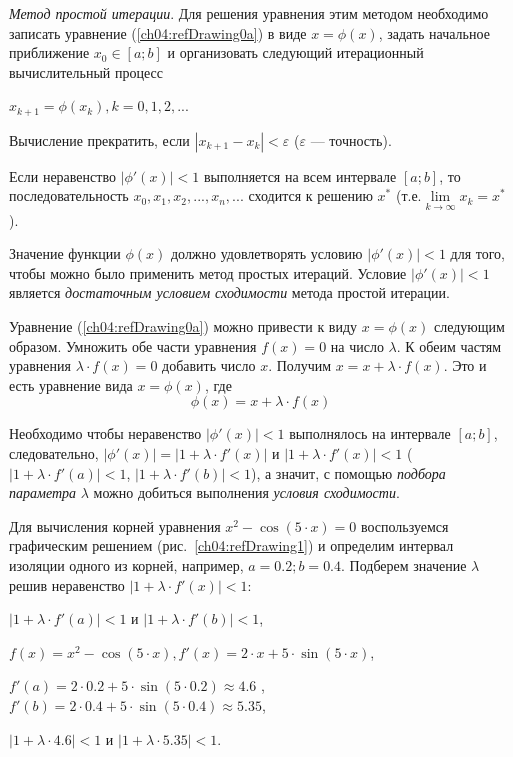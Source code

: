 \emph{Метод простой итерации}. Для решения уравнения этим методом необходимо записать уравнение
(\ref{ch04:refDrawing0a}) в виде  $x=\phi(x)$, задать начальное приближение  $x_0\in [a;b]$ и организовать следующий
итерационный вычислительный процесс 

$x_{k+1}=\phi(x_k),k=0,1,2,...$

Вычисление прекратить, если  $|x_{k+1}-x_k|<\varepsilon$
($\varepsilon$ --- точность).

Если неравенство  $|\phi'(x)|<1$ выполняется на всем интервале  $[a;b]$, то последовательность 
$x_0, x_1, x_2,...,x_n,...$ сходится к решению $x^*$ (т.е.$\lim\limits_{k\rightarrow \infty}x_k=x^*$).


Значение функции  $\phi(x)$  должно удовлетворять условию  $|\phi'(x)|<1$  для того, чтобы можно было применить метод
простых итераций. Условие  $|\phi'(x)|<1$  является
\emph{достаточным условием сходимости} метода простой итерации.

Уравнение (\ref{ch04:refDrawing0a}) можно привести к виду  $x=\phi(x)$ 
следующим образом. Умножить обе части уравнения  $f(x)=0$
на число  $\lambda$. К обеим частям уравнения  $\lambda\cdot f(x)=0$ добавить число $x$. Получим 
$x=x+\lambda\cdot f(x)$. Это и есть уравнение вида  $x=\phi(x)$, где 
\begin{equation}\label{ch04:refDrawing3a}
 \phi(x)=x+\lambda\cdot f(x)
\end{equation}

Необходимо чтобы неравенство  $|\phi'(x)|<1$ выполнялось на интервале  $[a;b]$, следовательно, 
$|\phi'(x)|=|1+\lambda\cdot f'(x)|$  и  $|1+\lambda\cdot f'(x)|<1$  ($|1+\lambda\cdot f'(a)|<1$,  $|1+\lambda\cdot
f'(b)|<1$), а значит, с помощью \emph{подбора параметра}  $\lambda$  можно добиться выполнения
\emph{условия сходимости}. 

Для вычисления корней уравнения  $x^2-\cos (5\cdot x)=0$  воспользуемся графическим 
решением (рис.~\ref{ch04:refDrawing1}) и
определим интервал изоляции одного из корней, например,  $a=0.2;b=0.4$. 
Подберем значение  $\lambda$  решив
неравенство  $|1+\lambda\cdot f'(x)|<1$:
 
$|1+\lambda\cdot f'(a)|<1$ и  $|1+\lambda\cdot f'(b)|<1$,

$f(x)=x^{2}-\cos (5\cdot x),f'(x)=2\cdot x+5\cdot \sin (5\cdot x)$,

$f'(a)=2\cdot 0.2+5\cdot \sin (5\cdot 0.2)\approx 4.6$ ,  $f'(b)=2\cdot 0.4+5\cdot \sin (5\cdot 0.4)\approx 5.35$,

 $|1+\lambda\cdot 4.6|<1$  и  $|1+\lambda\cdot 5.35|<1$.

